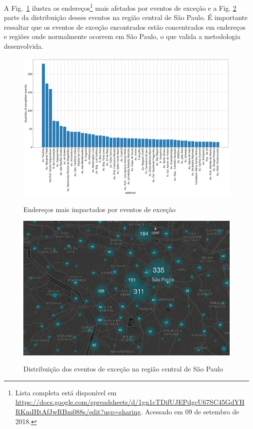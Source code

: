 \documentclass[
	12pt,				%
	oneside,			%
	a4paper,			%
	english,			%
	brazil				%
	]{abntex2ppgsi}
\begin{document}
A Fig.~\ref{fig:address_analysis} ilustra os endereços\footnote{Lista completa está disponível em \url{https://docs.google.com/spreadsheets/d/1gn1cTDifUJEPdgcU67SC45GdYHRKmIHtAfJwRBm088s/edit?usp=sharing}. Acessado em 09 de setembro de 2018.} mais afetados por eventos de exceção e a Fig. \ref{fig:dispersion} parte da distribuição desses eventos na região central de São Paulo. É importante ressaltar que os eventos de exceção encontrados estão concentrados em endereços e regiões onde normalmente ocorrem em São Paulo, o que valida a metodologia desenvolvida.

\begin{figure}[!htb]
	\centering
 	  \caption{Endereços mais impactados por eventos de exceção}
		\includegraphics[width=1\linewidth]{images/address_analysis.png}
	\label{fig:address_analysis}
\end{figure}

\begin{figure}[!htb]
	\centering
 	  \caption{Distribuição dos eventos de exceção na região central de São Paulo}
		\includegraphics[width=1\linewidth]{images/exception_events_sp.png}
	\label{fig:dispersion}
\end{figure}
\end{document}
